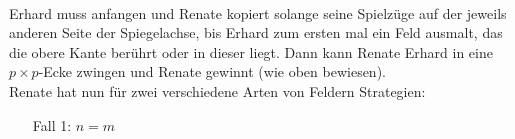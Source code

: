 \\
Erhard muss anfangen und Renate kopiert solange seine Spielzüge auf der jeweils anderen Seite der Spiegelachse, bis Erhard zum ersten mal ein Feld ausmalt, das die obere Kante berührt oder in dieser liegt. Dann kann Renate Erhard in eine $p\times p$-Ecke zwingen und Renate gewinnt (wie oben bewiesen).
\\[10pt]
Renate hat nun für zwei verschiedene Arten von Feldern Strategien:
\begin{itemize}
	\item[Fall 1:] $n=m$
\end{itemize}


